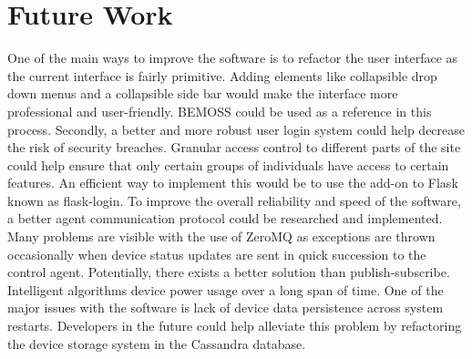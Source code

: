 \section{Future Work}
One of the main ways to improve the software is to refactor the user interface as the current interface is fairly primitive. Adding elements like collapsible drop down menus and a collapsible side bar would make the interface more professional and user-friendly. BEMOSS could be used as a reference in this process. Secondly, a better and more robust user login system could help decrease the risk of security breaches. Granular access control to different parts of the site could help ensure that only certain groups of individuals have access to certain features. An efficient way to implement this would be to use the add-on to Flask known as flask-login. To improve the overall reliability and speed of the software, a better agent communication protocol could be researched and implemented. Many problems are visible with the use of ZeroMQ as exceptions are thrown occasionally when device status updates are sent in quick succession to the control agent. Potentially, there exists a better solution than publish-subscribe. Intelligent algorithms device power usage over a long span of time. One of the major issues with the software is lack of device data persistence across system restarts. Developers in the future could help alleviate this problem by refactoring the device storage system in the Cassandra database.

